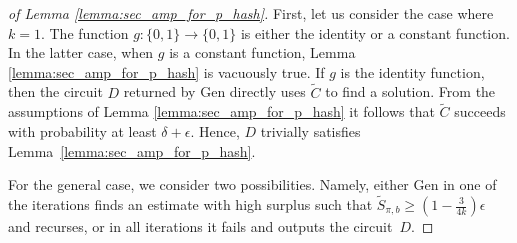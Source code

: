 %
%
\begin{proof}[of Lemma \ref{lemma:sec_amp_for_p_hash}]
First, let us consider the case where $k=1$. The function $g: \{0,1\} \rightarrow \{0,1\}$ is either the identity or a constant function.
In the latter case, when $g$ is a constant function, Lemma \ref{lemma:sec_amp_for_p_hash} is vacuously true.
If $g$ is the identity function, then the circuit $D$ returned by Gen directly uses $\widetilde{C}$ to find a solution.
From the assumptions of Lemma \ref{lemma:sec_amp_for_p_hash} it follows that $\widetilde{C}$ succeeds with probability at least
$\delta + \epsilon$. Hence, $D$ trivially satisfies Lemma~\ref{lemma:sec_amp_for_p_hash}.

For the general case, we consider two possibilities.
Namely, either Gen in one of the iterations finds an estimate with high surplus such that $\widetilde{S}_{\pi, b} \geq (1-\frac{3}{4k})\epsilon$ and recurses,
or in all iterations it fails and outputs the circuit~$D$.


\end{proof}

